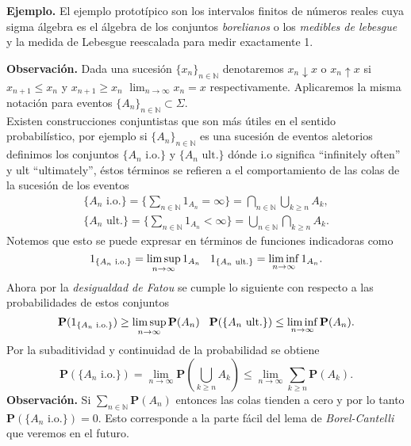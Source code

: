 \documentclass[letterpaper]{article}
\newcommand{\nat}{\ensuremath{ \mathbb N }}
\newcommand{\prob}{\textbf{P}}
\newcommand{\eje}{{\newline \noindent \sc \textbf{Ejemplo. }}}
\newcommand{\obs}{{\newline \noindent \sc \textbf{Observación. }}}
\newcommand{\sig}{\ensuremath{\Sigma}}
\begin{document}
\eje El ejemplo prototípico son los intervalos finitos de números reales cuya sigma álgebra es el álgebra de los conjuntos \emph{borelianos} o los \emph{medibles de lebesgue} y la medida de Lebesgue reescalada para medir exactamente 1.

\obs Dada una sucesión \(\{x_n\}_{n\in\nat}\) denotaremos \(x_n\downarrow x\) o \(x_n\uparrow x\) si \(x_{n+1}\leq x_n\) y \(x_{n+1}\geq x_n\) \(\lim_{n\rightarrow\infty}x_n=x\) respectivamente. Aplicaremos la misma notación para eventos \(\{A_n\}_{n\in\nat}\subset\sig\).\\
Existen construcciones conjuntistas que son más útiles en el sentido probabilístico, por ejemplo si \(\{A_n\}_{n\in\nat}\) es una sucesión de eventos aletorios definimos los conjuntos \(\{A_n\text{ i.o.}\}\) y \(\{A_n\text{ ult.}\}\) dónde i.o significa ``infinitely often'' y ult ``ultimately'', éstos términos se refieren a el comportamiento de las colas de la sucesión de los eventos
\begin{align*}
\{A_n\text{ i.o.}\}=\Big\{\sum_{n\in\nat}1_{A_n}=\infty\Big\}=\bigcap_{n\in\nat}\bigcup_{k\geq n}A_k,\\
\{A_n\text{ ult.}\}=\Big\{\sum_{n\in\nat}1_{A_n}<\infty\Big\}=\bigcup_{n\in\nat}\bigcap_{k\geq n}A_k.
\end{align*}
\noindent Notemos que esto se puede expresar en términos de funciones indicadoras como
\[
1_{\{A_n\text{ i.o.}\}}=\limsup_{n\rightarrow\infty}1_{A_n} \hspace{0.3cm} 1_{\{A_n\text{ ult.}\}}=\liminf_{n\rightarrow\infty}1_{A_n}.
\]
\noindent Ahora por la \emph{desigualdad de Fatou} se cumple lo siguiente con respecto a las probabilidades de estos conjuntos
\[
\prob(1_{\{A_n\text{ i.o.}\}})\geq\limsup_{n\rightarrow\infty}\prob(A_n)\hspace{0.3cm} \prob({\{A_n\text{ ult.}\}})\leq\liminf_{n\rightarrow\infty}\prob(A_n).
\]
\noindent Por la subaditividad y continuidad de la probabilidad se obtiene
\[
 \prob(\{A_n\text{ i.o.}\})=\lim_{n\rightarrow\infty}\prob(\bigcup_{k\geq n} A_k)\leq\lim_{n\rightarrow\infty}\sum_{k\geq n}\prob(A_k).
\]
\obs Si \(\sum_{n\in\nat}\prob(A_n)\) entonces las colas tienden a cero y por lo tanto \(\prob(\{A_n\text{ i.o.}\})=0\). Esto corresponde a la parte fácil del lema de \emph{Borel-Cantelli} que veremos en el futuro.
\end{document}
